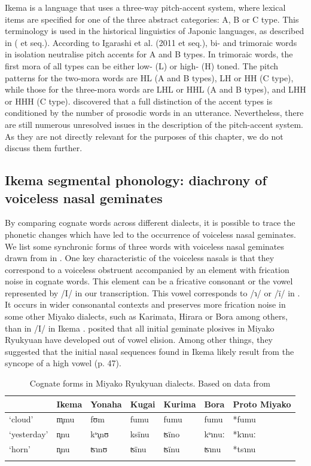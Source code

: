 \documentclass[output=paper]{langscibook}
\begin{document}
Ikema is a language that uses a three-way pitch-accent system, where lexical items are specified for one of the three abstract categories: A, B or C type. This terminology is used in the historical linguistics of Japonic languages, as described in \citeauthor{IgarashiEtAl2011} (\citeyear{IgarashiEtAl2011} et seq.). According to Igarashi et al. (2011 et seq.), bi- and trimoraic words in isolation neutralise pitch accents for A and B types. In trimoraic words, the first mora of all types can be either low- (L) or high- (H) toned. The pitch patterns for the two-mora words are HL (A and B types), LH or HH (C type), while those for the three-mora words are LHL or HHL (A and B types), and LHH or HHH (C type). \citet{IgarashiEtAl2018} discovered that a full distinction of the accent types is conditioned by the number of prosodic words in an utterance. Nevertheless, there are still numerous unresolved issues in the description of the pitch-accent system. As they are not directly relevant for the purposes of this chapter, we do not discuss them further.

\subsection{Ikema segmental phonology: diachrony of voiceless nasal geminates}
\label{sec:shinohara:1.3}
By comparing cognate words across different dialects, it is possible to trace the phonetic changes which have led to the occurrence of voiceless nasal geminates. We list some synchronic forms of three words with voiceless nasal geminates drawn from \citet{Kibe2012} in . One key characteristic of the voiceless nasals is that they correspond to a voiceless obstruent accompanied by an element with frication noise in cognate words. This element can be a fricative consonant or the vowel represented by /I/ in our transcription. This vowel corresponds to /ɿ/ or /ï/ in . It occurs in wider consonantal contexts and preserves more frication noise in some other Miyako dialects, such as Karimata, Hirara or Bora among others, than in /I/ in Ikema \citep{Kibe2012}. \citet[50]{PellardHayashi2012} posited that all initial geminate plosives in Miyako Ryukyuan have developed out of vowel elision. Among other things, they suggested that the initial nasal sequences found in Ikema likely result from the syncope of a high vowel (p. 47). 


\begin{table}
\begin{tabularx}{\textwidth}{lXlXlXl}
\lsptoprule
 & Ikema & Yonaha & Kugai & Kurima & Bora & Proto Miyako\\
 \midrule
‘cloud’ & m̥mu & fʊm & fumu & fumu & fumu & *fumu\\
‘yesterday’ & n̥nu & kˢɿ̥nʊ & ksïnu & ʦïno & kˢɿnuː & *kɿnuː\\
‘horn’ & n̥nu & ʦɿnʊ & ʦïnu & ʦïnu & ʦɿnu & *tsɿnu\\
\lspbottomrule
\end{tabularx}
\caption{Cognate forms in Miyako Ryukyuan dialects. Based on data from \citet{Kibe2012}}
\label{tab:shinohara:5}
\end{table}
\end{document}
